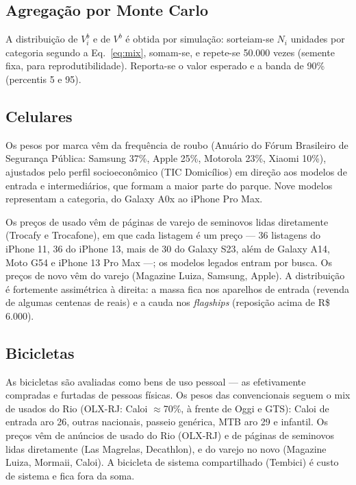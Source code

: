 \documentclass[11pt,a4paper]{article}
\newcommand{\reais}[1]{R\$\,#1}
\begin{document}
\subsection{Agregação por Monte Carlo}\label{sec:mc}
A distribuição de $V_i^b$ e de $V^b$ é obtida por simulação: sorteiam-se $N_i$ unidades por
categoria segundo a Eq.~\eqref{eq:mix}, somam-se, e repete-se 50.000 vezes (semente fixa, para
reprodutibilidade). Reporta-se o valor esperado e a banda de 90\% (percentis 5 e 95).

\subsection{Celulares}
Os pesos por marca vêm da frequência de roubo (Anuário do Fórum Brasileiro de Segurança Pública:
Samsung 37\%, Apple 25\%, Motorola 23\%, Xiaomi 10\%), ajustados pelo perfil socioeconômico (TIC
Domicílios) em direção aos modelos de entrada e intermediários, que formam a maior parte do parque.
Nove modelos representam a categoria, do Galaxy A0x ao iPhone Pro Max.

Os preços de usado vêm de páginas de varejo de seminovos lidas diretamente (Trocafy e Trocafone), em
que cada listagem é um preço --- 36 listagens do iPhone 11, 36 do iPhone 13, mais de 30 do Galaxy
S23, além de Galaxy A14, Moto G54 e iPhone 13 Pro Max ---; os modelos legados entram por busca. Os
preços de novo vêm do varejo (Magazine Luiza, Samsung, Apple). A distribuição é fortemente
assimétrica à direita: a massa fica nos aparelhos de entrada (revenda de algumas centenas de reais)
e a cauda nos \emph{flagships} (reposição acima de \reais{6.000}).

\subsection{Bicicletas}
As bicicletas são avaliadas como bens de uso pessoal --- as efetivamente compradas e furtadas de
pessoas físicas. Os pesos das convencionais seguem o mix de usados do Rio (OLX-RJ: Caloi
$\approx$70\%, à frente de Oggi e GTS): Caloi de entrada aro 26, outras nacionais, passeio genérica,
MTB aro 29 e infantil. Os preços vêm de anúncios de usado do Rio (OLX-RJ) e de páginas de seminovos
lidas diretamente (Las Magrelas, Decathlon), e do varejo no novo (Magazine Luiza, Mormaii, Caloi). A
bicicleta de sistema compartilhado (Tembici) é custo de sistema e fica fora da soma.
\end{document}

